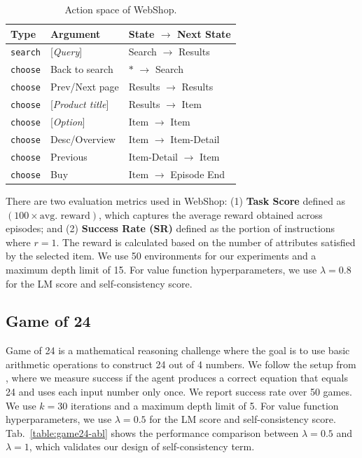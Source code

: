 {\begin{table}[ht]
    \centering
\begin{tabular}{lll}
\toprule
     Type &  Argument &  State $\rightarrow$ Next State \\
\midrule
    \texttt{search} & [\textit{Query}] & Search $\rightarrow$ Results\\ 
    \texttt{choose} & Back to search & $*$ $\rightarrow$ Search\\
    \texttt{choose} & Prev/Next page & Results $\rightarrow$ Results\\
    \texttt{choose} & [\textit{Product title}] & Results $\rightarrow$ Item\\
    \texttt{choose} & [\textit{Option}] & Item $\rightarrow$ Item\\
    \texttt{choose} & Desc/Overview & Item $\rightarrow$ Item-Detail\\
    \texttt{choose} & Previous & Item-Detail $\rightarrow$ Item\\
    \texttt{choose} & Buy & Item $\rightarrow$ Episode End\\
\bottomrule
\end{tabular}
\vspace{5pt}
\caption{Action space of WebShop.}
\label{table:action_space_}
\end{table}

There are two evaluation metrics used in WebShop: (1) \textbf{Task Score} defined as $(100 \times \text{avg. reward})$, which captures the average reward obtained across episodes; and (2) \textbf{Success Rate (SR)} defined as the portion of instructions where $r=1$. The reward is calculated based on the number of attributes satisfied by the selected item. We use 50 environments for our experiments and a maximum depth limit of 15. For value function hyperparameters, we use $\lambda = 0.8$ for the LM score and self-consistency score.

\subsection{Game of 24}

Game of 24 is a mathematical reasoning challenge where the goal is to use basic arithmetic operations to construct 24 out of 4 numbers. We follow the setup from \citet{yao2023tree}, where we measure success if the agent produces a correct equation that equals 24 and uses each input number only once. We report success rate over 50 games. We use $k = 30$ iterations and a maximum depth limit of 5. For value function hyperparameters, we use $\lambda = 0.5$ for the LM score and self-consistency score. Tab.~\ref{table:game24-abl} shows the performance comparison between $\lambda=0.5$ and $\lambda=1$, which validates our design of self-consistency term.

}
